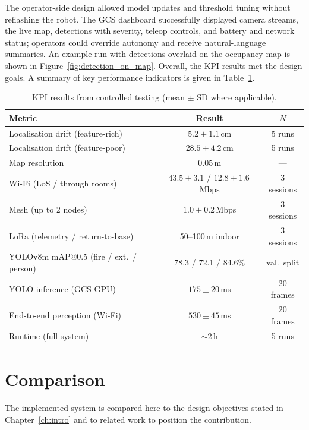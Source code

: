 The operator-side design allowed model updates and threshold tuning without reflashing the robot. The GCS dashboard successfully displayed camera streams, the live map, detections with severity, teleop controls, and battery and network status; operators could override autonomy and receive natural-language summaries. An example run with detections overlaid on the occupancy map is shown in Figure~\ref{fig:detection_on_map}. Overall, the KPI results met the design goals. A summary of key performance indicators is given in Table~\ref{tab:kpi}.

\begin{table}[htbp]
\caption{KPI results from controlled testing (mean $\pm$ SD where applicable).}
\label{tab:kpi}
\centering
\begin{tabular}{lcc}
\toprule
\textbf{Metric} & \textbf{Result} & \textbf{$N$} \\
\midrule
Localisation drift (feature-rich) & $5.2 \pm 1.1$\,cm & 5 runs \\
Localisation drift (feature-poor) & $28.5 \pm 4.2$\,cm & 5 runs \\
Map resolution & 0.05\,m & --- \\
Wi-Fi (LoS / through rooms) & $43.5 \pm 3.1$ / $12.8 \pm 1.6$\,Mbps & 3 sessions \\
Mesh (up to 2 nodes) & $1.0 \pm 0.2$\,Mbps & 3 sessions \\
LoRa (telemetry / return-to-base) & 50--100\,m indoor & 3 sessions \\
YOLOv8m mAP@0.5 (fire / ext.\ / person) & 78.3 / 72.1 / 84.6\% & val.\ split \\
YOLO inference (GCS GPU) & $175 \pm 20$\,ms & 20 frames \\
End-to-end perception (Wi-Fi) & $530 \pm 45$\,ms & 20 frames \\
Runtime (full system) & $\sim$2\,h & 5 runs \\
\bottomrule
\end{tabular}
\end{table}

\section{Comparison}

The implemented system is compared here to the design objectives stated in Chapter~\ref{ch:intro} and to related work to position the contribution.

